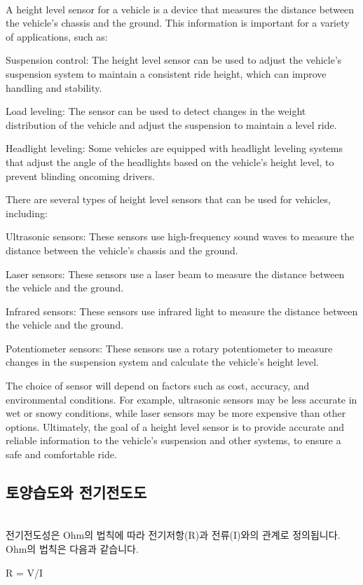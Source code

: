 \documentclass[11pt]{article}
\begin{document}
\indent \\A height level sensor for a vehicle is a device that measures the distance between the vehicle's chassis and the ground. This information is important for a variety of applications, such as:

Suspension control: The height level sensor can be used to adjust the vehicle's suspension system to maintain a consistent ride height, which can improve handling and stability.

Load leveling: The sensor can be used to detect changes in the weight distribution of the vehicle and adjust the suspension to maintain a level ride.

Headlight leveling: Some vehicles are equipped with headlight leveling systems that adjust the angle of the headlights based on the vehicle's height level, to prevent blinding oncoming drivers.

There are several types of height level sensors that can be used for vehicles, including:

Ultrasonic sensors: These sensors use high-frequency sound waves to measure the distance between the vehicle's chassis and the ground.

Laser sensors: These sensors use a laser beam to measure the distance between the vehicle and the ground.

Infrared sensors: These sensors use infrared light to measure the distance between the vehicle and the ground.

Potentiometer sensors: These sensors use a rotary potentiometer to measure changes in the suspension system and calculate the vehicle's height level.

The choice of sensor will depend on factors such as cost, accuracy, and environmental conditions. For example, ultrasonic sensors may be less accurate in wet or snowy conditions, while laser sensors may be more expensive than other options. Ultimately, the goal of a height level sensor is to provide accurate and reliable information to the vehicle's suspension and other systems, to ensure a safe and comfortable ride.

\subsection{토양습도와 전기전도도}
\indent \\전기전도성은 Ohm의 법칙에 따라 전기저항(R)과 전류(I)와의 관계로 정의됩니다. Ohm의 법칙은 다음과 같습니다.

R = V/I
\end{document}
